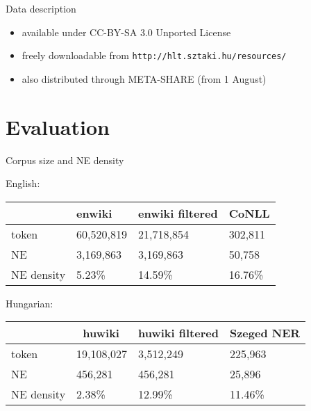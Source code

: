 \documentclass[utf8x,t]{beamer}
\begin{document}
\begin{frame}{Data description}

\begin{itemize}
\item available under CC-BY-SA 3.0 Unported License
\item freely downloadable from {\tt http://hlt.sztaki.hu/resources/} 
\item also distributed through META-SHARE (from 1 August)
\end{itemize}

\end{frame}

\section{Evaluation}

\begin{frame}{Corpus size and NE density}

English: 

\smallskip

\begin{center}
\begin{tabular}{llll}
\hline  & \bf enwiki & \bf enwiki filtered & \bf CoNLL \\ \hline
token & 60,520,819 & 21,718,854 & 302,811 \\
NE & 3,169,863 & 3,169,863 & 50,758 \\
NE density & 5.23\% & 14.59\% & 16.76\% \\ \hline
\end{tabular}
\end{center}

\smallskip

Hungarian:

\smallskip

\begin{center}
\begin{tabular}{llll}
\hline  & \bf huwiki & \bf huwiki filtered  & \bf Szeged NER \\ \hline
token & 19,108,027 & 3,512,249  & 225,963 \\
NE & 456,281 & 456,281  & 25,896 \\
NE density & 2.38\% & 12.99\%  & 11.46\% \\ \hline 
\end{tabular}
\end{center}

\end{frame}
\end{document}

